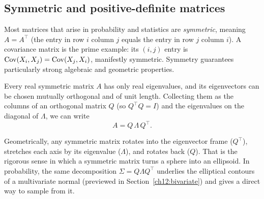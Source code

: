 \subsection{Symmetric and positive-definite matrices}
\label{chAcla:posdef}

Most matrices that arise in probability and statistics are \emph{symmetric},
meaning $A=A^\top$ (the entry in row $i$ column $j$ equals the entry in row $j$ column $i$). A
covariance matrix is the prime example: its $(i,j)$ entry is $\operatorname{Cov}(X_i,X_j)=\operatorname{Cov}(X_j,X_i)$, manifestly
symmetric. Symmetry guarantees particularly strong algebraic and geometric properties.

\begin{theorem}
\label{chAcla:thm-spectral}
Every real symmetric matrix $A$ has only real eigenvalues, and its eigenvectors can be chosen mutually
orthogonal and of unit length. Collecting them as the columns of an orthogonal matrix $Q$ (so
$Q^\top Q = I$) and the eigenvalues on the diagonal of $\Lambda$, we can write
\[
  A = Q\,\Lambda\,Q^\top.
\]
\end{theorem}

Geometrically, any symmetric matrix rotates into the eigenvector frame ($Q^\top$), stretches
each axis by its eigenvalue ($\Lambda$), and rotates back ($Q$). That is the rigorous sense
in which a symmetric matrix turns a sphere into an ellipsoid. In probability, the same
decomposition $\Sigma = Q\Lambda Q^\top$ underlies the elliptical contours of a multivariate
normal (previewed in Section~\ref{ch12:bivariate}) and gives a direct way to sample from it.

